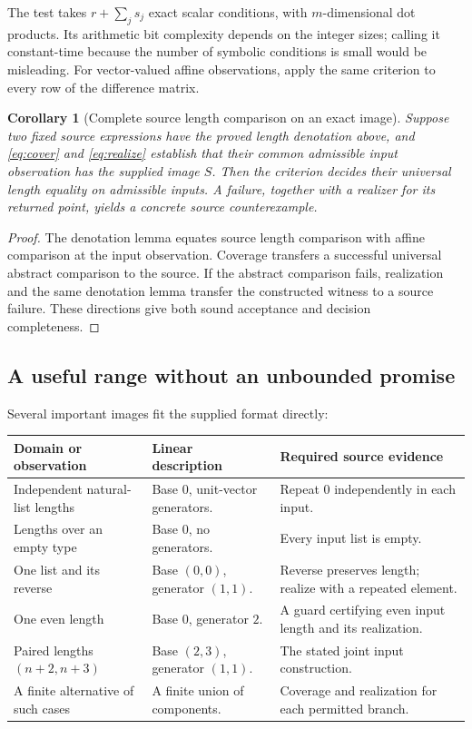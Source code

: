 \documentclass[11pt,letterpaper]{article}
\newtheorem{corollary}[theorem]{Corollary}
\theoremstyle{definition}\newtheorem{definition}[theorem]{Definition}
\theoremstyle{remark}\newtheorem{remark}[theorem]{Remark}
\begin{document}
The test takes $r+\sum_js_j$ exact scalar conditions, with $m$-dimensional
dot products. Its arithmetic bit complexity depends on the integer sizes;
calling it constant-time because the number of symbolic conditions is small
would be misleading. For vector-valued affine observations, apply the same
criterion to every row of the difference matrix.

\begin{corollary}[Complete source length comparison on an exact image]
Suppose two fixed source expressions have the proved length denotation above,
and \eqref{eq:cover} and \eqref{eq:realize} establish that their common
admissible input observation has the supplied image $S$. Then the criterion
decides their universal length equality on admissible inputs. A failure,
together with a realizer for its returned point, yields a concrete source
counterexample.
\end{corollary}
\begin{proof}
The denotation lemma equates source length comparison with affine comparison
at the input observation. Coverage transfers a successful universal abstract
comparison to the source. If the abstract comparison fails, realization and
the same denotation lemma transfer the constructed witness to a source
failure. These directions give both sound acceptance and decision completeness.
\end{proof}

\subsection{A useful range without an unbounded promise}
Several important images fit the supplied format directly:
\begin{center}\small
\begin{tabularx}{\textwidth}{@{}P{.28\textwidth}P{.27\textwidth}Y@{}}
\toprule Domain or observation & Linear description & Required source evidence\\\midrule
Independent natural-list lengths & Base $0$, unit-vector generators. & Repeat $0$ independently in each input.\\
Lengths over an empty type & Base $0$, no generators. & Every input list is empty.\\
One list and its reverse & Base $(0,0)$, generator $(1,1)$. & Reverse preserves length; realize with a repeated element.\\
One even length & Base $0$, generator $2$. & A guard certifying even input length and its realization.\\
Paired lengths $(n+2,n+3)$ & Base $(2,3)$, generator $(1,1)$. & The stated joint input construction.\\
A finite alternative of such cases & A finite union of components. & Coverage and realization for each permitted branch.\\
\bottomrule
\end{tabularx}
\end{center}
\end{document}
